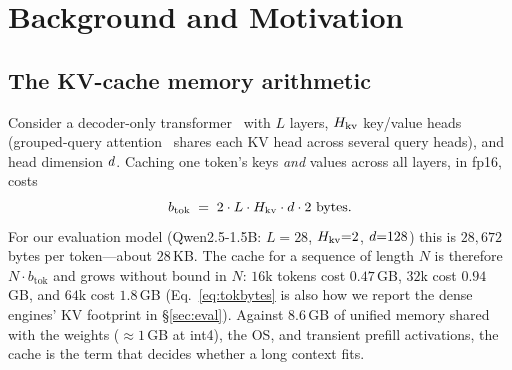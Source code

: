 \section{Background and Motivation}
\label{sec:background}

\subsection{The KV-cache memory arithmetic}
Consider a decoder-only transformer~\cite{vaswani2017attention} with $L$ layers, $H_{\mathrm{kv}}$ key/value
heads (grouped-query attention~\cite{ainslie2023gqa} shares each KV head across several query
heads), and head dimension $d$. Caching
one token's keys \emph{and} values across all layers, in fp16, costs
\begin{equation}
  b_{\text{tok}} \;=\; 2 \cdot L \cdot H_{\mathrm{kv}} \cdot d \cdot 2\ \text{bytes}.
  \label{eq:tokbytes}
\end{equation}
For our evaluation model (Qwen2.5-1.5B: $L{=}28$, $H_{\mathrm{kv}}{=}2$, $d{=}128$) this is
$28{,}672$ bytes per token---about $28$\,KB. The cache for a sequence of length $N$ is therefore
$N\cdot b_{\text{tok}}$ and grows without bound in $N$: $16$k tokens cost $0.47$\,GB, $32$k cost
$0.94$\,GB, and $64$k cost $1.8$\,GB (Eq.~\eqref{eq:tokbytes} is also how we report the dense
engines' KV footprint in \S\ref{sec:eval}). Against $8.6$\,GB of unified memory shared with the weights
($\approx 1$\,GB at int4), the OS, and transient prefill activations, the cache is the term that
decides whether a long context fits.


